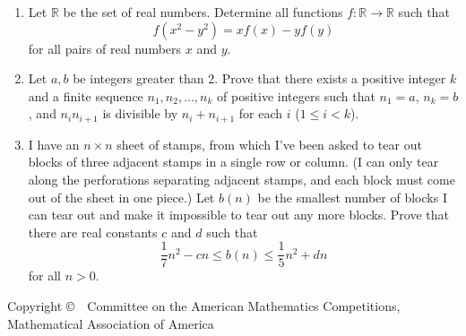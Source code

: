 \documentclass[12pt]{article}
\def\be{\begin{enumerate}}
\def\ii{\item}
\begin{document}
\bigskip

\be
\ii[4.] %
Let $\mathbb{R}$ be the set of real numbers. Determine all functions
$f: \mathbb{R} \to \mathbb{R}$ such that
\[
f(x^2 - y^2) = x f(x) - y f(y)
\]
for all pairs of real numbers $x$ and $y$.

\ii[5.] %
Let $a,b$ be integers greater than 2. Prove that there exists a positive
integer $k$ and a finite sequence $n_1, n_2, \dots, n_k$ of positive
integers such that $n_1 = a$, $n_k = b$, and $n_i n_{i+1}$
is divisible by $n_i + n_{i+1}$ for each $i$ ($1 \leq i < k$).

\ii[6.] %
I have an $n \times n$ sheet of stamps, from which I've been asked to tear 
out blocks of three adjacent stamps in a single row or column. (I can only
tear along the perforations separating adjacent stamps, and each block
must come out of the sheet in one piece.) Let $b(n)$ be the smallest number
of blocks I can tear out and make it impossible to tear out any more
blocks. Prove that there are real constants $c$ and $d$ such that
\[
\frac{1}{7} n^2 - cn \leq b(n) \leq \frac{1}{5} n^2 + dn
\]
for all $n > 0$.

\end{enumerate}

\vspace{80mm}
{\small
\begin{center}
Copyright \copyright \ \  Committee on the American  Mathematics  Competitions,\\
Mathematical Association of America
\end{center}
}
\end{document}
